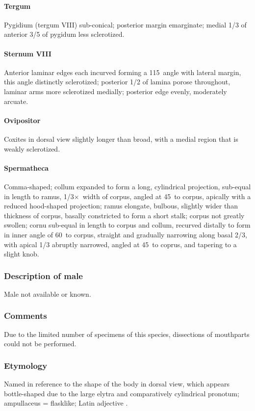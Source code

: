 \documentclass[fleqn,10pt,lineno]{wlpeerj} %
\newcommand{\td}{\textdegree~}
\newcommand{\x}{$\times$~}
\begin{document}
			\paragraph{Tergum}
				Pygidium (tergum VIII) sub-conical; posterior margin emarginate; medial 1/3 of anterior 3/5 of pygidum less sclerotized.		
			\paragraph{Sternum VIII}
				Anterior laminar edges each incurved forming a 115\td angle with lateral margin, this angle distinctly sclerotized; posterior 1/2 of lamina porose throughout, laminar arms more sclerotized medially; posterior edge evenly, moderately arcuate.
			\paragraph{Ovipositor}
				Coxites in dorsal view slightly longer than broad, with a medial region that is weakly sclerotized.
			\paragraph{Spermatheca}
				Comma-shaped; collum expanded to form a long, cylindrical projection, sub-equal in length to ramus, 1/3\x width of corpus, angled at 45\td to corpus, apically with a reduced hood-shaped projection; ramus elongate, bulbous, slightly wider than thickness of corpus, basally constricted to form a short stalk; corpus not greatly swollen; cornu sub-equal in length to corpus and collum, recurved distally to form in inner angle of 60\td to corpus, straight and gradually narrowing along basal 2/3, with apical 1/3 abruptly narrowed, angled at 45\td to coprus, and tapering to a slight knob.
		\subsubsection*{Description of male}
			Male not available or known.
		\subsubsection*{Comments}
			Due to the limited number of specimens of this species, dissections of mouthparts could not be performed.
		\subsubsection*{Etymology}
			Named in reference to the shape of the body in dorsal view, which appears bottle-shaped due to the large elytra and comparatively cylindrical pronotum; ampullaceus = flasklike; Latin adjective \citep{brown1956}.
\end{document}
